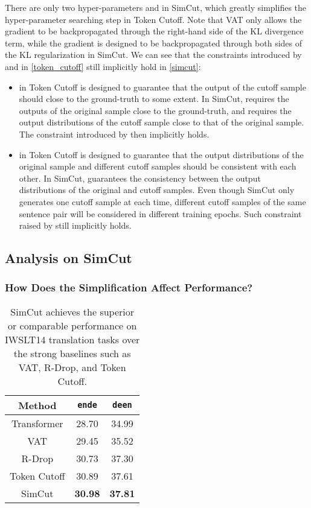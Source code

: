 \documentclass[11pt]{article}
\begin{document}
There are only two hyper-parameters  and  in SimCut, which greatly simplifies the hyper-parameter searching step in Token Cutoff. Note that VAT only allows the gradient to be backpropagated through the right-hand side of the KL divergence term, while the gradient is designed to be backpropagated through both sides of the KL regularization in SimCut. We can see that the constraints introduced by  and  in \eqref{token_cutoff} still implicitly hold in \eqref{simcut}:
\begin{itemize}
\item  in Token Cutoff is designed to guarantee that the output of the cutoff sample should close to the ground-truth to some extent. In SimCut,  requires the outputs of the original sample close to the ground-truth, and  requires the output distributions of the cutoff sample close to that of the original sample. The constraint introduced by  then implicitly holds.
\item  in Token Cutoff is designed to guarantee that the output distributions of the original sample and  different cutoff samples should be consistent with each other. In SimCut,  guarantees the consistency between the output distributions of the original and cutoff samples. Even though SimCut only generates one cutoff sample at each time, different cutoff samples of the same sentence pair will be considered in different training epochs. Such constraint raised by  still implicitly holds.
\end{itemize}


\subsection{Analysis on SimCut}

\subsubsection{How Does the Simplification Affect Performance?}

\begin{table}
\centering
\begin{tabular}{c|c|c}
\hline
Method & \texttt{en}\texttt{de} & \texttt{de}\texttt{en} \\
\hline\hline
Transformer & 28.70 & 34.99 \\
VAT & 29.45 & 35.52 \\
R-Drop & 30.73 & 37.30 \\
Token Cutoff & 30.89 & 37.61 \\
\hline
SimCut & \bf 30.98 & \bf 37.81 \\
\end{tabular}
\caption{SimCut achieves the superior or comparable performance on IWSLT14  translation tasks over the strong baselines such as VAT, R-Drop, and Token Cutoff. \label{simplification}}
\end{table}
\end{document}
